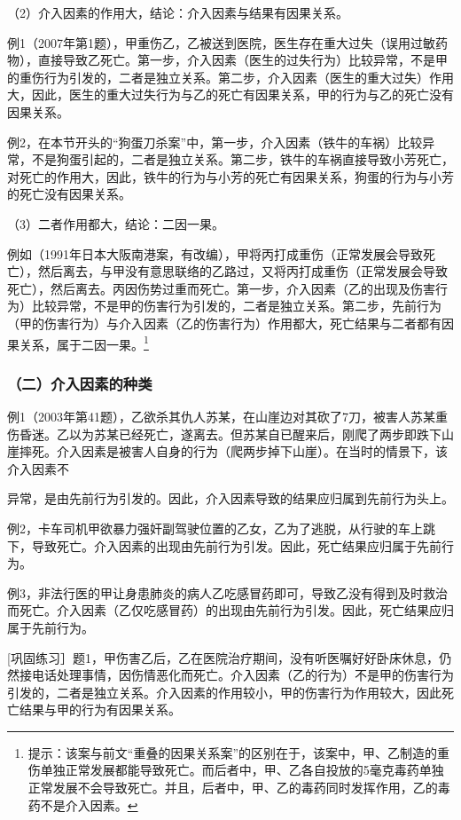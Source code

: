 （2）介入因素的作用大，结论：介入因素与结果有因果关系。

例1（2007年第1题），甲重伤乙，乙被送到医院，医生存在重大过失（误用过敏药物），直接导致乙死亡。第一步，介入因素（医生的过失行为）比较异常，不是甲的重伤行为引发的，二者是独立关系。第二步，介入因素（医生的重大过失）作用大，因此，医生的重大过失行为与乙的死亡有因果关系，甲的行为与乙的死亡没有因果关系。

例2，在本节开头的“狗蛋刀杀案”中，第一步，介入因素（铁牛的车祸）比较异常，不是狗蛋引起的，二者是独立关系。第二步，铁牛的车祸直接导致小芳死亡，对死亡的作用大，因此，铁牛的行为与小芳的死亡有因果关系，狗蛋的行为与小芳的死亡没有因果关系。

（3）二者作用都大，结论：二因一果。

例如（1991年日本大阪南港案，有改编），甲将丙打成重伤（正常发展会导致死亡），然后离去，与甲没有意思联络的乙路过，又将丙打成重伤（正常发展会导致死亡），然后离去。丙因伤势过重而死亡。第一步，介入因素（乙的出现及伤害行为）比较异常，不是甲的伤害行为引发的，二者是独立关系。第二步，先前行为（甲的伤害行为）与介入因素（乙的伤害行为）作用都大，死亡结果与二者都有因果关系，属于二因一果。\footnote{提示：该案与前文“重叠的因果关系案”的区别在于，该案中，甲、乙制造的重伤单独正常发展都能导致死亡。而后者中，甲、乙各自投放的5毫克毒药单独正常发展不会导致死亡。并且，后者中，甲、乙的毒药同时发挥作用，乙的毒药不是介入因素。}

\subsubsection*{（二）介入因素的种类}


例1（2003年第41题），乙欲杀其仇人苏某，在山崖边对其砍了7刀，被害人苏某重伤昏迷。乙以为苏某已经死亡，遂离去。但苏某自已醒来后，刚爬了两步即跌下山崖摔死。介入因素是被害人自身的行为（爬两步掉下山崖）。在当时的情景下，该介入因素不

异常，是由先前行为引发的。因此，介入因素导致的结果应归属到先前行为头上。

例2，卡车司机甲欲暴力强奸副驾驶位置的乙女，乙为了逃脱，从行驶的车上跳下，导致死亡。介入因素的出现由先前行为引发。因此，死亡结果应归属于先前行为。

例3，非法行医的甲让身患肺炎的病人乙吃感冒药即可，导致乙没有得到及时救治而死亡。介入因素（乙仅吃感冒药）的出现由先前行为引发。因此，死亡结果应归属于先前行为。

[巩固练习］题1，甲伤害乙后，乙在医院治疗期间，没有听医嘱好好卧床休息，仍然接电话处理事情，因伤情恶化而死亡。介入因素（乙的行为）不是甲的伤害行为引发的，二者是独立关系。介入因素的作用较小，甲的伤害行为作用较大，因此死亡结果与甲的行为有因果关系。

